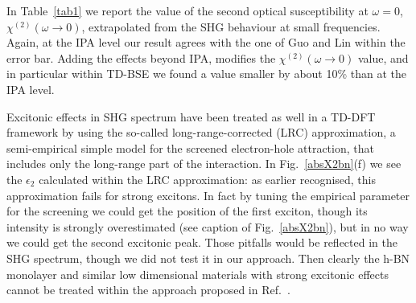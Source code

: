 In  Table~\ref{tab1} we report  the value of the second optical susceptibility at $\omega=0$, $\chi^{(2)}(\omega \to 0)$, extrapolated from the SHG  behaviour at small frequencies.    
Again, at the IPA level our result agrees with the one of Guo and Lin\cite{guo2005second} within the error bar. Adding the effects beyond IPA, modifies the $\chi^{(2)}(\omega \to 0)$ value, and in particular within TD-BSE we found a value smaller by about 10\% than at the IPA level.

Excitonic effects in SHG spectrum have been treated as well in a TD-DFT framework\cite{PhysRevB.82.235201} by using the so-called long-range-corrected (LRC) approximation,\cite{LRC} a semi-empirical simple model for the screened electron-hole attraction, that includes only the long-range part of the interaction. In Fig.~\ref{absX2bn}(f) we see the $\epsilon_2$ calculated within the LRC approximation: as earlier recognised, this approximation fails for strong excitons. In fact by tuning the empirical parameter for the screening we could get the position of the first exciton, though its intensity is strongly overestimated (see caption of Fig.~\ref{absX2bn}), but in no way we could get the second excitonic peak. Those pitfalls would be reflected in the SHG spectrum, though we did not test it in our approach. Then clearly the h-BN monolayer and similar low dimensional materials with strong excitonic effects cannot be treated within the approach proposed in Ref.~\cite{PhysRevB.82.235201}.


